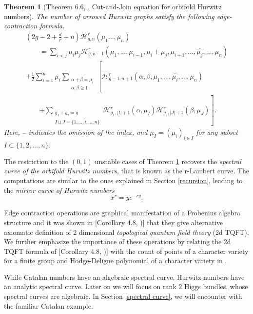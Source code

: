 \documentclass[oneside, 11pt]{amsart}
\newtheorem{thm}{Theorem}[section]
\theoremstyle{definition}
\numberwithin{equation}{subsection}
\def\a{\alpha}
\def\b{\beta}
\newcommand{\be}{\begin{equation}}
\newcommand{\ee}{\end{equation}}
\newcommand{\cH}{{\mathcal{H}}}
\newcommand{\half}{{\frac{1}{2}}}
\begin{document}
\begin{thm}[Theorem 6.6, \cite{OD16}, Cut-and-Join equation for orbifold Hurwitz numbers]
\label{thm:ECF}
The number of arrowed Hurwitz graphs
satisfy the following edge-contraction formula.
\be
\label{ECF}
\begin{aligned}
 &\left(2g-2+\frac{d}{r}+ n\right)
 \cH_{g,n}^r(\mu_1\dots,\mu_n) 
\\
&\qquad
=
\sum_{i< j}\mu_i\mu_j
\cH_{g,n-1}^r (\mu_1,\dots,\mu_{i-1},
\mu_i+\mu_j,\mu_{i+1},\dots,
\widehat{\mu_j},\dots,\mu_n)
\\
\qquad
&+\half \sum_{i=1}^n
\mu_i \sum_{\substack{\a+\b=\mu_i\\
\a, \b\ge 1}}
\left[\cH_{g-1,n+1}^r (\a,\b,\mu_1,\dots,
\widehat{\mu_i},\dots,\mu_n)
\phantom{\sum_{\substack{g_1+g_2=g\\
I\sqcup J = \{1,\dots,\hat{i},\dots,n\}}}}
\right.
\\
&\qquad
\left.
+\sum_{\substack{g_1+g_2=g\\
I\sqcup J = \{1,\dots,\hat{i},\dots,n\}
}}
\cH_{g_1,|I|+1}^r (\a,\mu_I)
\cH_{g_2,|J|+1}^r (\b,\mu_J)
\right].
\end{aligned}
\ee
Here, $\widehat{\;\;}$ indicates the omission
of the index, and $\mu_I = (\mu_i)_{i\in I}$
for any subset $I\subset\{1,2,\dots,n\}$.
\end{thm}

The restriction to the $(0,1)$ unstable cases of Theorem \ref{thm:ECF} recovers the \textit{spectral curve of the orbifold Hurwitz numbers}, that is known as the r-Lambert curve. The computations are similar to the ones explained in Section \ref{recursion}, leading to the \textit{mirror curve of Hurwitz numbers}
$$x^r=ye^{-ry}.$$


Edge contraction operations are graphical manifestation of a Frobenius algebra structure and it was shown in [Corollary 4.8, \cite{OD16})] that they give alternative axiomatic definition of 2 dimensional \textit{topological quantum field theory} (2d TQFT). We further emphasize the importance of these operations by relating the 2d TQFT formula of [Corollary 4.8, \cite{OD16})] with the count of points of a character variety for a finite group and Hodge-Deligne polynomial of a character variety in \cite{OD21, OD22}.

While Catalan numbers have an algebraic spectral curve, Hurwitz numbers have an analytic spectral curve. Later on we will focus on rank $2$ Higgs bundles, whose spectral curves are algebraic. In Section \ref{spectral curve}, we will encounter
  with the familiar Catalan example.
  
\end{document}
